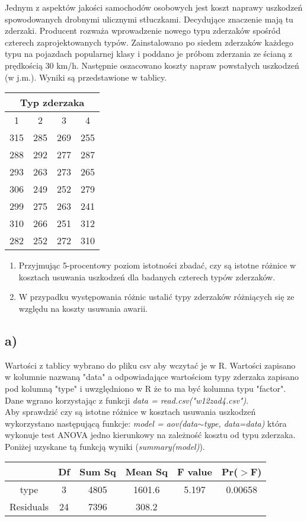 \documentclass{article}
\begin{document}
Jednym z aspektów jakości samochodów osobowych jest koszt naprawy uszkodzeń spowodowanych drobnymi ulicznymi stłuczkami. Decydujące znaczenie mają tu zderzaki. Producent rozważa wprowadzenie nowego typu
zderzaków spośród czterech zaprojektowanych typów. Zainstalowano po siedem zderzaków każdego typu na pojazdach
popularnej klasy i poddano je próbom zderzania ze ścianą
z prędkością 30 km/h. Następnie oszacowano koszty napraw
powstałych uszkodzeń (w j.m.). Wyniki są przedstawione w
tablicy.

\begin{center} \begin{tabular}{|c|c|c|c|} \hline
\multicolumn{4}{|c|}{Typ zderzaka} \\ \hline
1 & 2 & 3 & 4 \\ \hline
315 & 285 & 269 & 255 \\ \hline
288 & 292 & 277 & 287 \\ \hline
293 & 263 & 273 & 265 \\ \hline
306 & 249 & 252 & 279 \\ \hline
299 & 275 & 263 & 241 \\ \hline
310 & 266 & 251 & 312 \\ \hline
282 & 252 & 272 & 310 \\ \hline
\end{tabular} \end{center}

\begin{enumerate}[label = \alph*)]
\item Przyjmując 5-procentowy poziom istotności zbadać, czy są
istotne różnice w kosztach usuwania uszkodzeń dla badanych
czterech typów zderzaków.
\item W przypadku występowania różnic ustalić typy zderzaków
różniących się ze względu na koszty usuwania awarii.
\end{enumerate}

\subsection{a)}
Wartości z tablicy wybrano do pliku csv aby wczytać je w R. Wartości zapisano w kolumnie nazwaną "data" a odpowiadające wartościom typy zderzaka zapisano pod kolumną "type" i uwzględniono w R że to ma być kolumna typu "factor". Dane wgrano korzystając z funkcji \textit{data = read.csv("w12zad4.csv")}. \\
Aby sprawdzić czy są istotne różnice w kosztach usuwania uszkodzeń wykorzystano następującą funkcje: \textit{model = aov(data$\sim$type, data=data)} która wykonuje test ANOVA jedno kierunkowy na zależność kosztu od typu zderzaka. Poniżej uzyskane tą funkcją wyniki (\textit{summary(model)}).
\begin{center} \begin{tabular}{|c|c|c|c|c|c|} \hline
& Df & Sum Sq & Mean Sq & F value & Pr($>$F) \\ \hline
type & 3 & 4805 & 1601.6 & 5.197 & 0.00658  \\ \hline
Residuals & 24 & 7396 & 308.2 & \multicolumn{2}{|c|}{} \\ \hline
\end{tabular} \end{center}
\end{document}
